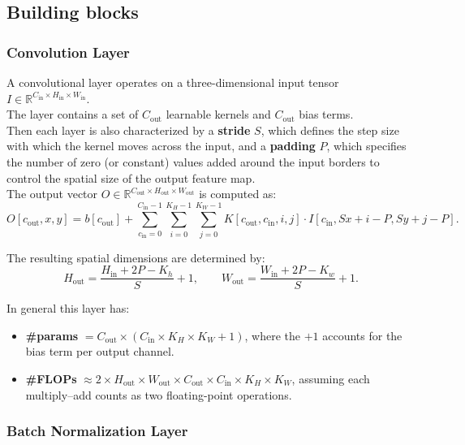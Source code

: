 \subsection{Building blocks}

\subsubsection{Convolution Layer}

A convolutional layer operates on a three-dimensional input tensor $I \in \mathbb{R}^{C_\text{in} \times H_\text{in} \times W_\text{in}}$. \\
The layer contains a set of $C_\text{out}$ learnable kernels and $C_\text{out}$ bias terms. \\
Then each layer is also characterized by a \textbf{stride} $S$, which defines the step size with which the kernel moves across the input, and a \textbf{padding} $P$, which specifies the number of zero (or constant) values added around the input borders to control the spatial size of the output feature map. \\
The output vector $O \in \mathbb{R}^{C_\text{out} \times H_\text{out} \times W_\text{out}}$ is computed as:
\[
O[c_\text{out}, x, y] =  b[c_\text{out}] + \sum_{c_\text{in}=0}^{C_\text{in}-1} 
\sum_{i=0}^{K_H - 1} \sum_{j=0}^{K_W - 1}
K[c_\text{out}, c_\text{in}, i, j] \cdot 
I[c_\text{in}, Sx + i - P, Sy + j - P].
\]

The resulting spatial dimensions are determined by:
\[
H_\text{out} = \frac{H_\text{in} + 2P - K_h}{S} + 1, \qquad
W_\text{out} = \frac{W_\text{in} + 2P - K_w}{S} + 1.
\]

In general this layer has:
\begin{itemize}
    \item \textbf{\#params} $= C_\text{out} \times (C_\text{in} \times K_H \times K_W + 1)$,  
    where the $+1$ accounts for the bias term per output channel.

    \item \textbf{\#FLOPs} $\approx 2 \times H_\text{out} \times W_\text{out} \times C_\text{out} \times C_\text{in} \times K_H \times K_W$,  
    assuming each multiply–add counts as two floating-point operations.
\end{itemize}

\subsubsection{Batch Normalization Layer}

